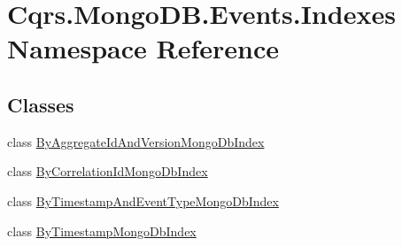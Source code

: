 \hypertarget{namespaceCqrs_1_1MongoDB_1_1Events_1_1Indexes}{}\section{Cqrs.\+Mongo\+D\+B.\+Events.\+Indexes Namespace Reference}
\label{namespaceCqrs_1_1MongoDB_1_1Events_1_1Indexes}
\subsection*{Classes}
\begin{DoxyCompactItemize}
\item 
class \hyperlink{classCqrs_1_1MongoDB_1_1Events_1_1Indexes_1_1ByAggregateIdAndVersionMongoDbIndex}{By\+Aggregate\+Id\+And\+Version\+Mongo\+Db\+Index}
\item 
class \hyperlink{classCqrs_1_1MongoDB_1_1Events_1_1Indexes_1_1ByCorrelationIdMongoDbIndex}{By\+Correlation\+Id\+Mongo\+Db\+Index}
\item 
class \hyperlink{classCqrs_1_1MongoDB_1_1Events_1_1Indexes_1_1ByTimestampAndEventTypeMongoDbIndex}{By\+Timestamp\+And\+Event\+Type\+Mongo\+Db\+Index}
\item 
class \hyperlink{classCqrs_1_1MongoDB_1_1Events_1_1Indexes_1_1ByTimestampMongoDbIndex}{By\+Timestamp\+Mongo\+Db\+Index}
\end{DoxyCompactItemize}
